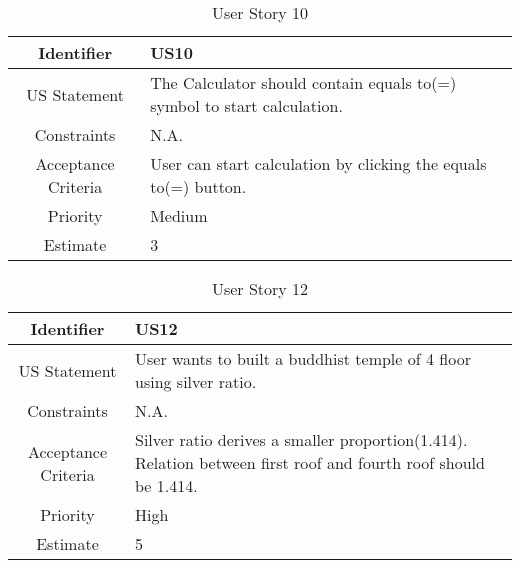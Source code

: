 \documentclass[12pt]{article}
\begin{document}
\begin{table}[h]
    \begin{tabular}{|c|p{14cm}|}
    \hline
      Identifier   & US10 \\
      \hline
       US Statement  & The Calculator should contain equals to(=) symbol to start calculation. \\
       \hline
       Constraints & N.A. \\
       \hline
       Acceptance Criteria & User can start calculation by clicking the equals to(=) button.\\
       \hline
       Priority & Medium\\
       \hline
       Estimate & 3\\
       \hline
    \end{tabular}
    \caption{User Story 10}
\label{table:10}
\end{table}

\begin{table}[h]
    \begin{tabular}{|c|p{14cm}|}
    \hline
      Identifier   & US12 \\
      \hline
      US Statement  & User wants to built a buddhist temple of 4 floor using silver ratio.  \\
       \hline
       Constraints & N.A.\\
       \hline
      Acceptance Criteria & Silver ratio derives a smaller proportion(1.414). Relation between first roof and fourth roof should be 1.414. \\
       \hline
       Priority & High\\
       \hline
       Estimate & 5\\
       \hline
    \end{tabular}
    \caption{User Story 12}
\label{table:12}
\end{table}
\end{document}
